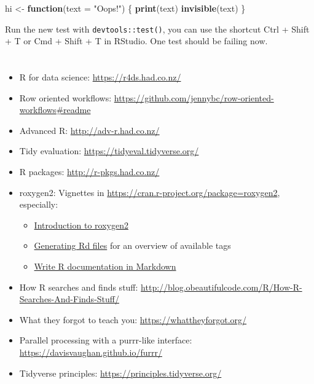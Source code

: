 \documentclass[]{book}
\newenvironment{Shaded}{\begin{snugshade}}{\end{snugshade}}
\newcommand{\ControlFlowTok}[1]{\textcolor[rgb]{0.13,0.29,0.53}{\textbf{#1}}}
\newcommand{\DataTypeTok}[1]{\textcolor[rgb]{0.13,0.29,0.53}{#1}}
\newcommand{\KeywordTok}[1]{\textcolor[rgb]{0.13,0.29,0.53}{\textbf{#1}}}
\newcommand{\NormalTok}[1]{#1}
\newcommand{\StringTok}[1]{\textcolor[rgb]{0.31,0.60,0.02}{#1}}
\begin{document}
\begin{Shaded}
\begin{Highlighting}[]
\NormalTok{hi <-}\StringTok{ }\ControlFlowTok{function}\NormalTok{(}\DataTypeTok{text =} \StringTok{"Oops!"}\NormalTok{) \{}
  \KeywordTok{print}\NormalTok{(text)}
  \KeywordTok{invisible}\NormalTok{(text)}
\NormalTok{\}}
\end{Highlighting}
\end{Shaded}

Run the new test with \texttt{devtools::test()}, you can use the shortcut Ctrl + Shift + T or Cmd + Shift + T in RStudio.
One test should be failing now.

\hypertarget{section-3}{%
\chapter{}\label{section-3}}

\begin{itemize}
\item
  R for data science: \url{https://r4ds.had.co.nz/}
\item
  Row oriented workflows: \url{https://github.com/jennybc/row-oriented-workflows\#readme}
\item
  Advanced R: \url{http://adv-r.had.co.nz/}
\item
  Tidy evaluation: \url{https://tidyeval.tidyverse.org/}
\item
  R packages: \url{http://r-pkgs.had.co.nz/}
\item
  roxygen2: Vignettes in \url{https://cran.r-project.org/package=roxygen2}, especially:

  \begin{itemize}
  \item
    \href{https://cran.r-project.org/web/packages/roxygen2/vignettes/roxygen2.html}{Introduction to roxygen2}
  \item
    \href{https://cran.r-project.org/web/packages/roxygen2/vignettes/rd.html}{Generating Rd files} for an overview of available tags
  \item
    \href{https://cran.r-project.org/web/packages/roxygen2/vignettes/markdown.html}{Write R documentation in Markdown}
  \end{itemize}
\item
  How R searches and finds stuff: \url{http://blog.obeautifulcode.com/R/How-R-Searches-And-Finds-Stuff/}
\item
  What they forgot to teach you: \url{https://whattheyforgot.org/}
\item
  Parallel processing with a purrr-like interface: \url{https://davisvaughan.github.io/furrr/}
\item
  Tidyverse principles: \url{https://principles.tidyverse.org/}
\end{itemize}
\end{document}
